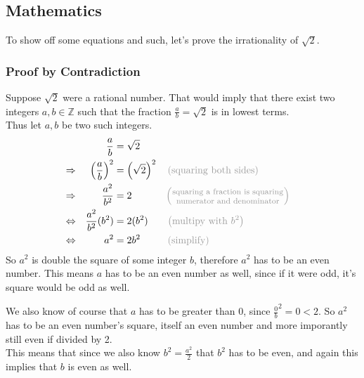 \documentclass{article}
\newcommand{\mexpl}[1]{\color{gray_custom}\left(\text{#1}\right)}
\newcommand{\mexplbig}[1]{ \color{gray_custom}{\left(\parbox{4cm}{
              \centering \footnotesize #1 }\right)} }
\begin{document}
  \subsection{Mathematics}\label{subsec:maths}
    To show off some equations and such, let's prove the irrationality of
    $\sqrt{2}$. 

  \subsubsection*{Proof by Contradiction}
    Suppose $\sqrt{2}$ were a rational number. 
    That would imply that there exist two integers $a,b\in\mathbb{Z}$ such that
    the fraction $\frac{a}{b} = \sqrt{2}$ is in lowest terms. \\
    Thus let $a,b$ be two such integers. 
    \begin{align*}
      &&
          \frac{a}{b}                     &=          \sqrt{2}
                                                                              \\
      \Rightarrow&&       
          \left(\frac{a}{b}\right)^2      &=          \left(\sqrt{2}\right)^2
          &&\mexpl{squaring both sides}
                                                                              \\
      \Rightarrow&&       
          \frac{a^2}{b^2}                 &=          2
          &&\mexplbig{
              squaring a fraction is squaring numerator and denominator
          }
                                                                              \\
      \Leftrightarrow&&       
          \frac{a^2}{b^2}(b^2)            &=          2(b^2)
          &&\mexpl{multipy with $b^2$}
                                                                              \\
      \Leftrightarrow&&       
          a^2                             &=          2b^2
          &&\mexpl{simplify}
    \end{align*}
    So $a^2$ is double the square of some integer $b$, therefore $a^2$ has to
    be an even number. 
    This means $a$ has to be an even number as well, since if it were odd, it's
    square would be odd as well.

    We also know of course that $a$ has to be greater than $0$, since
    $\frac{0}{b}^2 = 0 < 2$. 
    So $a^2$ has to be an even number's square, itself an even number and more
    imporantly still even if divided by 2. \\
    This means that since we also know $b^2 = \frac{a^2}{2}$ that $b^2$ has to
    be even, and again this implies that $b$ is even as well. 
\end{document}
